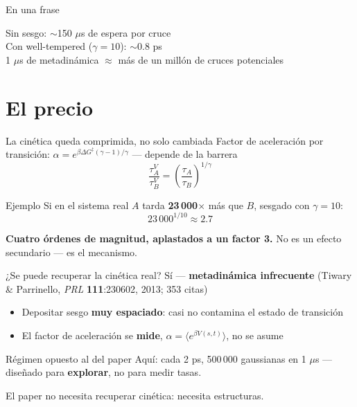 \documentclass[aspectratio=169,11pt]{beamer}
\begin{document}
\begin{frame}{En una frase}
  \begin{center}
    \Large
    Sin sesgo: \alert{$\sim$150 $\mu$s} de espera por cruce\\[0.5em]
    Con well-tempered ($\gamma=10$): \alert{$\sim$0.8 ps}\\[1.2em]
    \normalsize\color{migris}
    1 $\mu$s de metadinámica $\approx$ más de un millón de cruces potenciales
  \end{center}
\end{frame}

\section{El precio}

\begin{frame}{La cinética queda comprimida, no solo cambiada}
  Factor de aceleración por transición: $\alpha = e^{\beta\Delta G^{\ddagger}(\gamma-1)/\gamma}$ — \alert{depende de la barrera}
  $$\frac{\tau_A^V}{\tau_B^V} = \left(\frac{\tau_A}{\tau_B}\right)^{1/\gamma}$$
  \vspace{0.3em}
  \begin{exampleblock}{Ejemplo}
    Si en el sistema real $A$ tarda \textbf{23\,000$\times$} más que $B$, sesgado con $\gamma=10$:
    $$23\,000^{1/10} \approx \mathbf{2.7}$$
  \end{exampleblock}
  \textbf{Cuatro órdenes de magnitud, aplastados a un factor 3.} No es un efecto secundario — es el mecanismo.
\end{frame}

\begin{frame}{¿Se puede recuperar la cinética real?}
  Sí — \textbf{metadinámica infrecuente} (Tiwary \& Parrinello, \textit{PRL} \textbf{111}:230602, 2013; 353 citas)
  \begin{itemize}
    \item Depositar sesgo \textbf{muy espaciado}: casi no contamina el estado de transición
    \item El factor de aceleración se \textbf{mide}, $\alpha=\langle e^{\beta V(s,t)}\rangle$, no se asume
  \end{itemize}
  \begin{alertblock}{Régimen opuesto al del paper}
    Aquí: cada 2 ps, 500\,000 gaussianas en 1 $\mu$s — diseñado para \textbf{explorar}, no para medir tasas.
  \end{alertblock}
  \centering \alert{El paper no necesita recuperar cinética: necesita estructuras.}
\end{frame}
\end{document}
